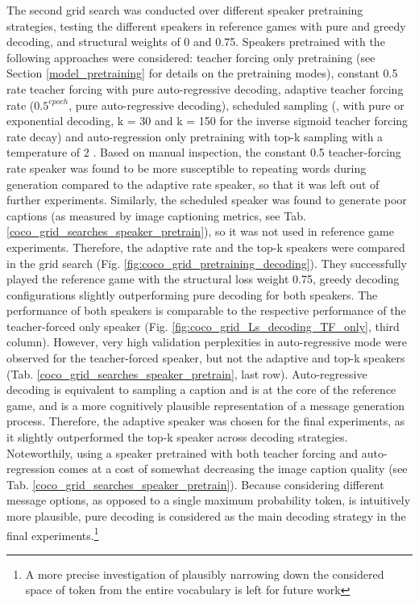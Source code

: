 The second grid search was conducted over different speaker pretraining strategies, testing the different speakers in reference games with pure and greedy decoding, and structural weights of 0 and 0.75. Speakers pretrained with the following approaches were considered: teacher forcing only pretraining (see Section \ref{model_pretraining} for details on the pretraining modes), constant 0.5 rate teacher forcing with pure auto-regressive decoding, adaptive teacher forcing rate ($0.5^{epoch}$, pure auto-regressive decoding), scheduled sampling (\cite{bengio2015scheduled}, with pure or exponential decoding, k = 30 and k = 150 for the inverse sigmoid teacher forcing rate decay) and auto-regression only pretraining with top-k sampling with a temperature of 2 \parencite[following][]{lazaridou2020multi}.
Based on manual inspection, the constant 0.5 teacher-forcing rate speaker was found to be more susceptible to repeating words during generation compared to the adaptive rate speaker, so that it was left out of further experiments. Similarly, the scheduled speaker was found to generate poor captions (as measured by image captioning metrics, see Tab. \ref{coco_grid_searches_speaker_pretrain}), so it was not used in reference game experiments. 
Therefore, the adaptive rate and the top-k speakers were compared in the grid search (Fig. \ref{fig:coco_grid_pretraining_decoding}). 
They successfully played the reference game with the structural loss weight 0.75, greedy decoding configurations slightly outperforming pure decoding for both speakers. The performance of both speakers is comparable to the respective performance of the teacher-forced only speaker (Fig. \ref{fig:coco_grid_Ls_decoding_TF_only}, third column). However, very high validation perplexities in auto-regressive mode were observed for the teacher-forced speaker, but not the adaptive  and top-k speakers (Tab. \ref{coco_grid_searches_speaker_pretrain}, last row). Auto-regressive decoding is equivalent to sampling a caption and is at the core of the reference game, and is a more cognitively plausible representation of a message generation process. Therefore, the adaptive speaker was chosen for the final experiments, as it slightly outperformed the top-k speaker across decoding strategies. Noteworthily, using a speaker pretrained with both teacher forcing and auto-regression comes at a cost of somewhat decreasing the image caption quality (see Tab. \ref{coco_grid_searches_speaker_pretrain}).
Because considering different message options, as opposed to a single maximum probability token, is intuitively more plausible, pure decoding is considered as the main decoding strategy in the final experiments.\footnote{A more precise investigation of plausibly narrowing down the considered space of token from the entire vocabulary is left for future work}

